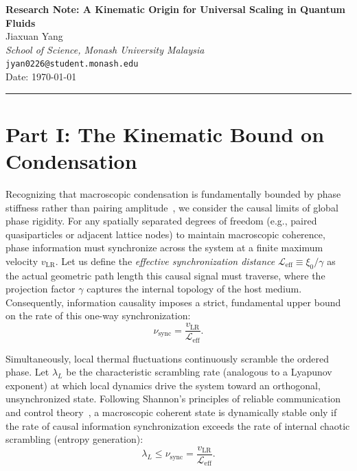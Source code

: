 \documentclass[11pt,a4paper]{article}
\begin{document}
\begin{center}
    \textbf{\LARGE Research Note: A Kinematic Origin for Universal Scaling in Quantum Fluids} \\[0.6cm]
    {\large Jiaxuan Yang} \\[0.1cm]
    {\small \textit{School of Science, Monash University Malaysia}} \\[0.1cm]
    {\small \texttt{jyan0226@student.monash.edu}} \\[0.4cm]
    {\small Date: \today}
\end{center}

\vspace{0.4cm}
\hrule
\vspace{0.6cm}

\section*{Part I: The Kinematic Bound on Condensation}
Recognizing that macroscopic condensation is fundamentally bounded by phase stiffness rather than pairing amplitude~\cite{Emery1995,Uemura1989,Kosterlitz1973}, we consider the causal limits of global phase rigidity. For any spatially separated degrees of freedom (e.g., paired quasiparticles or adjacent lattice nodes) to maintain macroscopic coherence, phase information must synchronize across the system at a finite maximum velocity $v_{\text{LR}}$. Let us define the \textit{effective synchronization distance} $\mathcal{L}_{\text{eff}} \equiv \xi_0 / \gamma$ as the actual geometric path length this causal signal must traverse, where the projection factor $\gamma$ captures the internal topology of the host medium. Consequently, information causality imposes a strict, fundamental upper bound on the rate of this one-way synchronization:
\begin{equation}
\nu_{\text{sync}} = \frac{v_{\text{LR}}}{\mathcal{L}_{\text{eff}}}.
\label{eq:nu_sync}
\end{equation}

Simultaneously, local thermal fluctuations continuously scramble the ordered phase. Let $\lambda_L$ be the characteristic scrambling rate (analogous to a Lyapunov exponent) at which local dynamics drive the system toward an orthogonal, unsynchronized state. Following Shannon's principles of reliable communication and control theory~\cite{Shannon1948}, a macroscopic coherent state is dynamically stable only if the rate of causal information synchronization exceeds the rate of internal chaotic scrambling (entropy generation):
\begin{equation}
\lambda_L \le \nu_{\text{sync}} = \frac{v_{\text{LR}}}{\mathcal{L}_{\text{eff}}}.
\label{eq:shannon}
\end{equation}
\end{document}
